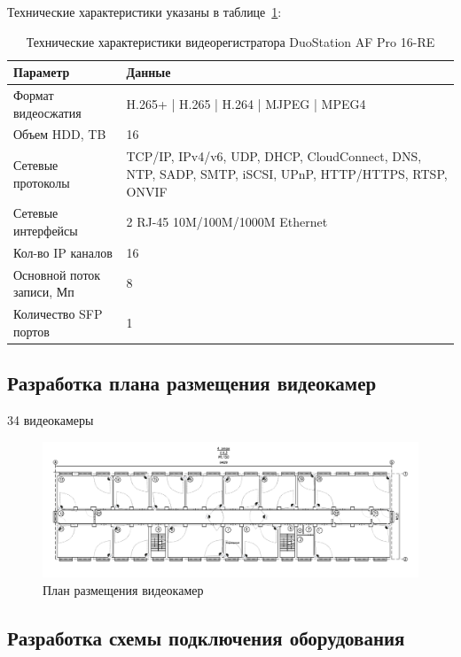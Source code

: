 Технические характеристики указаны в таблице~\ref{tab::recorder-parameters}:
\begin{longtable}{|p{5cm}|p{12cm}|}
    \caption{Технические характеристики видеорегистратора DuoStation AF Pro 16-RE}
    \label{tab::recorder-parameters} \\

    \hline
    Параметр &
    Данные \\
    \hline
    Формат видеосжатия &
    H.265+ | H.265 | H.264 | MJPEG | MPEG4 \\
    \hline
    Объем HDD, TB &
    16 \\
    \hline
    Сетевые протоколы &
    TCP/IP, IPv4/v6, UDP, DHCP, CloudConnect, DNS, NTP, SADP, SMTP, iSCSI, UPnP, HTTP/HTTPS, RTSP, ONVIF \\
    \hline
    Сетевые интерфейсы &
    2 RJ-45 10M/100M/1000M Ethernet \\
    \hline
    Кол-во IP каналов &
    16 \\
    \hline
    Основной поток записи, Мп &
    8 \\
    \hline
    Количество SFP портов &
    1 \\
    \hline
\end{longtable}

\subsection{Разработка плана размещения видеокамер}

34 видеокамеры

\begin{figure}
    \begin{center}
        \includegraphics[width=240mm]{images/План размещения видеокамер}
    \end{center}
    \captionsetup{justification=centering}
    \caption{План размещения видеокамер}
    \label{fig::videocameras_placement}
\end{figure}


\subsection{Разработка схемы подключения оборудования}

